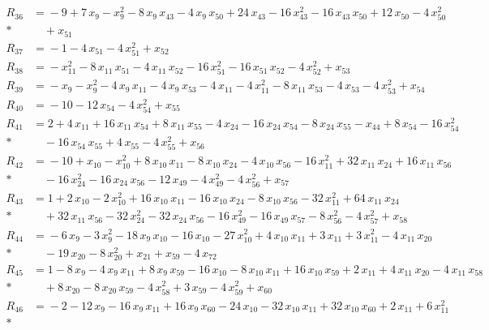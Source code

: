 \begin{align*}
R_{36} &={} -9 +7\,x_{9} -x_{9}^{2} -8\,x_{9}\,x_{43} -4\,x_{9}\,x_{50} +24\,x_{43} -16\,x_{43}^{2} -16\,x_{43}\,x_{50} +12\,x_{50} -4\,x_{50}^{2} \\*
&\quad{} +x_{51} \\[3pt]
R_{37} &={} -1 -4\,x_{51} -4\,x_{51}^{2} +x_{52} \\[3pt]
R_{38} &={} -x_{11}^{2} -8\,x_{11}\,x_{51} -4\,x_{11}\,x_{52} -16\,x_{51}^{2} -16\,x_{51}\,x_{52} -4\,x_{52}^{2} +x_{53} \\[3pt]
R_{39} &={} -x_{9} -x_{9}^{2} -4\,x_{9}\,x_{11} -4\,x_{9}\,x_{53} -4\,x_{11} -4\,x_{11}^{2} -8\,x_{11}\,x_{53} -4\,x_{53} -4\,x_{53}^{2} +x_{54} \\[3pt]
R_{40} &={} -10 -12\,x_{54} -4\,x_{54}^{2} +x_{55} \\[3pt]
R_{41} &={} 2 +4\,x_{11} +16\,x_{11}\,x_{54} +8\,x_{11}\,x_{55} -4\,x_{24} -16\,x_{24}\,x_{54} -8\,x_{24}\,x_{55} -x_{44} +8\,x_{54} -16\,x_{54}^{2} \\*
&\quad{} -16\,x_{54}\,x_{55} +4\,x_{55} -4\,x_{55}^{2} +x_{56} \\[3pt]
R_{42} &={} -10 +x_{10} -x_{10}^{2} +8\,x_{10}\,x_{11} -8\,x_{10}\,x_{24} -4\,x_{10}\,x_{56} -16\,x_{11}^{2} +32\,x_{11}\,x_{24} +16\,x_{11}\,x_{56} \\*
&\quad{} -16\,x_{24}^{2} -16\,x_{24}\,x_{56} -12\,x_{49} -4\,x_{49}^{2} -4\,x_{56}^{2} +x_{57} \\[3pt]
R_{43} &={} 1 +2\,x_{10} -2\,x_{10}^{2} +16\,x_{10}\,x_{11} -16\,x_{10}\,x_{24} -8\,x_{10}\,x_{56} -32\,x_{11}^{2} +64\,x_{11}\,x_{24} \\*
&\quad{} +32\,x_{11}\,x_{56} -32\,x_{24}^{2} -32\,x_{24}\,x_{56} -16\,x_{49}^{2} -16\,x_{49}\,x_{57} -8\,x_{56}^{2} -4\,x_{57}^{2} +x_{58} \\[3pt]
R_{44} &={} -6\,x_{9} -3\,x_{9}^{2} -18\,x_{9}\,x_{10} -16\,x_{10} -27\,x_{10}^{2} +4\,x_{10}\,x_{11} +3\,x_{11} +3\,x_{11}^{2} -4\,x_{11}\,x_{20} \\*
&\quad{} -19\,x_{20} -8\,x_{20}^{2} +x_{21} +x_{59} -4\,x_{72} \\[3pt]
R_{45} &={} 1 -8\,x_{9} -4\,x_{9}\,x_{11} +8\,x_{9}\,x_{59} -16\,x_{10} -8\,x_{10}\,x_{11} +16\,x_{10}\,x_{59} +2\,x_{11} +4\,x_{11}\,x_{20} -4\,x_{11}\,x_{58} \\*
&\quad{} +8\,x_{20} -8\,x_{20}\,x_{59} -4\,x_{58}^{2} +3\,x_{59} -4\,x_{59}^{2} +x_{60} \\[3pt]
R_{46} &={} -2 -12\,x_{9} -16\,x_{9}\,x_{11} +16\,x_{9}\,x_{60} -24\,x_{10} -32\,x_{10}\,x_{11} +32\,x_{10}\,x_{60} +2\,x_{11} +6\,x_{11}^{2} \\*

\end{align*}
